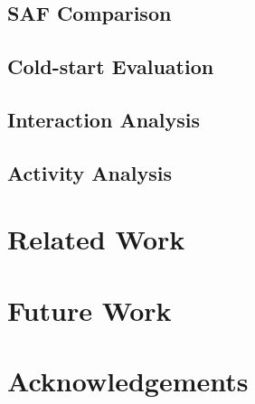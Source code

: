 \documentclass[letterpaper]{sig-alternate-2013}
\begin{document}


\subsection{SAF Comparison}
\label{sec:saf_analysis}



\subsection{Cold-start Evaluation}
\label{sec:coldstart_analysis}



\subsection{Interaction Analysis}
\label{sec:interaction_analysis}



\subsection{Activity Analysis}
\label{sec:activity_analysis}



\section{Related Work}



\section{Future Work}



{\small
\section{Acknowledgements}

}



\end{document}
